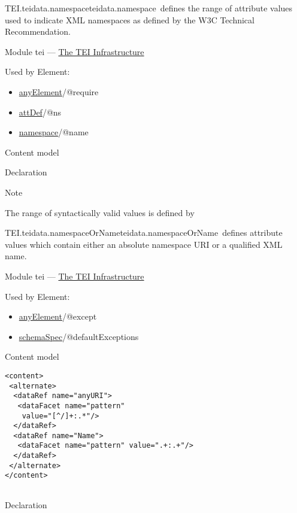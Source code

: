 \begin{reflist}
\item[]\begin{specHead}{TEI.teidata.namespace}{teidata.namespace} defines the range of attribute values used to indicate XML namespaces as defined by the W3C  Technical Recommendation.\end{specHead} 
    \item[{Module}]
  tei — \hyperref[ST]{The TEI Infrastructure}
    \item[{Used by}]
  Element: \begin{itemize}
\item \hyperref[TEI.anyElement]{anyElement}/@require
\item \hyperref[TEI.attDef]{attDef}/@ns
\item \hyperref[TEI.namespace]{namespace}/@name
\end{itemize} 
    \item[{Content model}]
    \item[{Declaration}]
    \item[{Note}]
  \par
The range of syntactically valid values is defined by 
\end{reflist}  
\begin{reflist}
\item[]\begin{specHead}{TEI.teidata.namespaceOrName}{teidata.namespaceOrName} defines attribute values which contain either an absolute namespace URI or a qualified XML name.\end{specHead} 
    \item[{Module}]
  tei — \hyperref[ST]{The TEI Infrastructure}
    \item[{Used by}]
  Element: \begin{itemize}
\item \hyperref[TEI.anyElement]{anyElement}/@except
\item \hyperref[TEI.schemaSpec]{schemaSpec}/@defaultExceptions
\end{itemize} 
    \item[{Content model}]
  \mbox{}\hfill\\[-10pt]\begin{Verbatim}[fontsize=\small]
<content>
 <alternate>
  <dataRef name="anyURI">
   <dataFacet name="pattern"
    value="[^/]+:.*"/>
  </dataRef>
  <dataRef name="Name">
   <dataFacet name="pattern" value=".+:.+"/>
  </dataRef>
 </alternate>
</content>
    
\end{Verbatim}

    \item[{Declaration}]
\end{reflist}  
